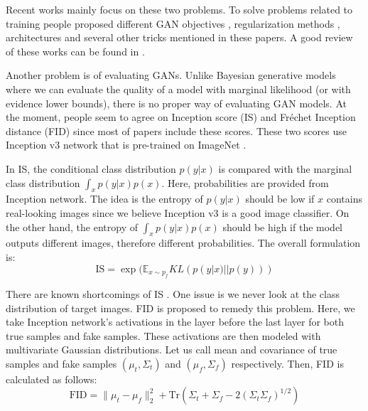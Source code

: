 \documentclass[a4paper,onesided,12pt]{report}
\begin{document}
Recent works mainly focus on these two problems. To solve problems related to training people proposed different GAN objectives \cite{wgan,infogan,leastgan,lsgan}, regularization methods \cite{improved_wgan,sngan,dcgan}, architectures \cite{biggan,bigan,ali,proggan,stylegan,dcgan,sagan} and several other tricks mentioned in these papers. A good review of these works can be found in \cite{ganreview,ganreview2,ganreview3}.

Another problem is of evaluating GANs. Unlike Bayesian generative models where we can evaluate the quality of a model with marginal likelihood (or with evidence lower bounds), there is no proper way of evaluating GAN models. At the moment, people seem to agree on Inception score (IS) \cite{improvedtechniques} and Fr\'echet Inception distance (FID) \cite{twotimes} since most of papers include these scores. These two scores use Inception v3 network \cite{inceptionv3} that is pre-trained on ImageNet \cite{imagenet}. 

In IS, the conditional class distribution $p(y|x)$ is compared with the marginal class distribution $\int_x p(y|x) p(x)$. Here, probabilities are provided from Inception network. The idea is the entropy of $p(y|x)$ should be low if $x$ contains real-looking images since we believe Inception v3 is a good image classifier. On the other hand, the entropy of $\int_x p(y | x) p(x)$ should be high if the model outputs different images, therefore different probabilities. The overall formulation is:
\begin{equation}
\label{eq:is}
\text{IS}=\exp (\mathbb{E}_{x \sim p_f} KL (p(y|x) || p(y))) 
\end{equation}

There are known shortcomings of IS \cite{twotimes,inceptionnote}. One issue is we never look at the class distribution of target images. FID is proposed to remedy this problem. Here, we take Inception network's activations in the layer before the last layer for both true samples and fake samples. These activations are then modeled with multivariate Gaussian distributions. Let us call mean and covariance of true samples and fake samples $(\mu_t, \Sigma_t)$ and $(\mu_f, \Sigma_f)$ respectively. Then, FID is calculated as follows:
\begin{equation}
\label{eq:fid}
\text{FID} = \| \mu_t - \mu_f \|_2^2 + \text{Tr}(\Sigma_t + \Sigma_f - 2(\Sigma_t \Sigma_f)^{1/2})
\end{equation}
\end{document}
